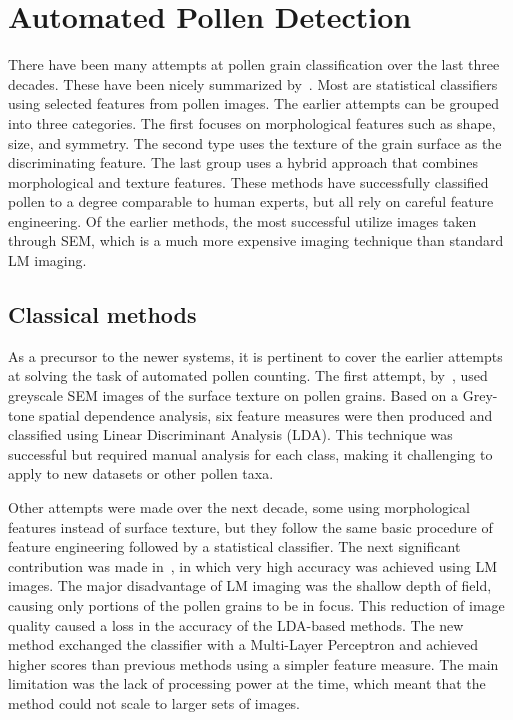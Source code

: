 \section{Automated Pollen Detection}\label{sec:rel-pollen}
There have been many attempts at pollen grain classification over the last three decades.
These have been nicely summarized by\ \textcite{sevillano_improving_2018}.
Most are statistical classifiers using selected features from pollen images.
The earlier attempts can be grouped into three categories.
The first focuses on morphological features such as shape, size, and symmetry.
The second type uses the texture of the grain surface as the discriminating feature.
The last group uses a hybrid approach that combines morphological and texture features.
These methods have successfully classified pollen to a degree comparable to human experts, but all rely on careful feature engineering.
Of the earlier methods, the most successful utilize images taken through SEM, which is a much more expensive imaging technique than standard LM imaging.

\subsection{Classical methods}
As a precursor to the newer systems, it is pertinent to cover the earlier attempts at solving the task of automated pollen counting.
The first attempt, by\ \textcite{langford_computerized_1990}, used greyscale SEM images of the surface texture on pollen grains.
Based on a Grey-tone spatial dependence analysis, six feature measures were then produced and classified using Linear Discriminant Analysis (LDA).
This technique was successful but required manual analysis for each class, making it challenging to apply to new datasets or other pollen taxa.

Other attempts were made over the next decade, some using morphological features instead of surface texture, but they follow the same basic procedure of feature engineering followed by a statistical classifier.
The next significant contribution was made in\ \textcite{li_pollen_1999}, in which very high accuracy was achieved using LM images.
The major disadvantage of LM imaging was the shallow depth of field, causing only portions of the pollen grains to be in focus.
This reduction of image quality caused a loss in the accuracy of the LDA-based methods.
The new method exchanged the classifier with a Multi-Layer Perceptron and achieved higher scores than previous methods using a simpler feature measure.
The main limitation was the lack of processing power at the time, which meant that the method could not scale to larger sets of images.

